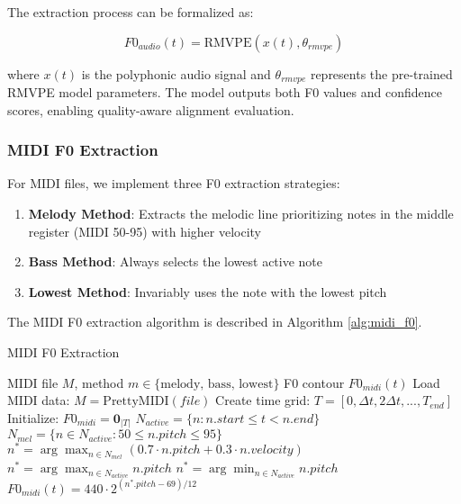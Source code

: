 \documentclass[12pt,a4paper]{article}
\begin{document}
The extraction process can be formalized as:

\begin{equation}
F0_{audio}(t) = \text{RMVPE}(x(t), \theta_{rmvpe})
\end{equation}

where $x(t)$ is the polyphonic audio signal and $\theta_{rmvpe}$ represents the pre-trained RMVPE model parameters. The model outputs both F0 values and confidence scores, enabling quality-aware alignment evaluation.

\subsubsection{MIDI F0 Extraction}

For MIDI files, we implement three F0 extraction strategies:

\begin{enumerate}
    \item \textbf{Melody Method}: Extracts the melodic line prioritizing notes in the middle register (MIDI 50-95) with higher velocity
    \item \textbf{Bass Method}: Always selects the lowest active note
    \item \textbf{Lowest Method}: Invariably uses the note with the lowest pitch
\end{enumerate}

The MIDI F0 extraction algorithm is described in Algorithm \ref{alg:midi_f0}.

\begin{algorithm}
\caption{MIDI F0 Extraction}
\label{alg:midi_f0}
\begin{algorithmic}[1]
\REQUIRE MIDI file $M$, method $m \in \{\text{melody, bass, lowest}\}$
\ENSURE F0 contour $F0_{midi}(t)$
\STATE Load MIDI data: $M = \text{PrettyMIDI}(file)$
\STATE Create time grid: $T = [0, \Delta t, 2\Delta t, ..., T_{end}]$
\STATE Initialize: $F0_{midi} = \mathbf{0}_{|T|}$
    \STATE $N_{active} = \{n : n.start \leq t < n.end\}$
            \STATE $N_{mel} = \{n \in N_{active} : 50 \leq n.pitch \leq 95\}$
                \STATE $n^* = \arg\max_{n \in N_{mel}} (0.7 \cdot n.pitch + 0.3 \cdot n.velocity)$
            \ELSE
                \STATE $n^* = \arg\max_{n \in N_{active}} n.pitch$
            \ENDIF
            \STATE $n^* = \arg\min_{n \in N_{active}} n.pitch$
        \ENDIF
        \STATE $F0_{midi}(t) = 440 \cdot 2^{(n^*.pitch - 69)/12}$
    \ENDIF
\ENDFOR
\end{algorithmic}
\end{algorithm}
\end{document}
